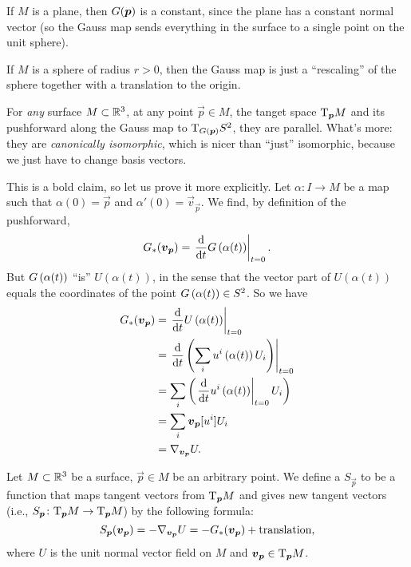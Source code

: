 \begin{example}
If $M$ is a plane, then $G(\boldsymbol{p})$ is a constant, since the plane
has a constant normal vector (so the Gauss map sends everything in the
surface to a single point on the unit sphere).
\end{example}

\begin{example}
If $M$ is a sphere of radius $r>0$, then the Gauss map is just a
``rescaling'' of the sphere together with a translation to the origin.
\end{example}

For \emph{any} surface $M\subset\mathbb{R}^{3}$, at any point $\vec{p}\in M$,
the tanget space $\mathrm{T}_{\boldsymbol{p}}M$ and its pushforward along the Gauss map
to $\mathrm{T}_{G(\boldsymbol{p})}S^{2}$, they are parallel. What's
more: they are \emph{canonically isomorphic}, which is nicer than
``just'' isomorphic, because we just have to change basis vectors.

This is a bold claim, so let us prove it more explicitly. Let
$\alpha\colon I\to M$ be a map such that $\alpha(0)=\vec{p}$ and
$\alpha'(0)=\vec{v}_{\vec{p}}$. We find, by definition of the pushforward,
\begin{equation}
G_{*}(\boldsymbol{v}_{\boldsymbol{p}}) = \left.\frac{\mathrm{d}}{\mathrm{d} t} G\left(\alpha(t)\right)\right|_{t=0}.
\end{equation}
But $G\left(\alpha(t)\right)$ ``is'' $U\left(\alpha(t)\right)$, in
the sense that the vector part of $U\left(\alpha(t)\right)$ equals the
coordinates of the point $G\left(\alpha(t)\right)\in S^{2}$. So we
have
\begin{subequations}
\begin{align}
G_{*}(\boldsymbol{v}_{\boldsymbol{p}}) &= \left.\frac{\mathrm{d}}{\mathrm{d} t}U\left(\alpha(t)\right)\right|_{t=0}\\
&= \left.\frac{\mathrm{d}}{\mathrm{d} t}\left(\sum_{i}u^{i}\left(\alpha(t)\right)U_{i}\right)\right|_{t=0}\\
&= \sum_{i}\left(\left.\frac{\mathrm{d}}{\mathrm{d} t}u^{i}\left(\alpha(t)
\right)\right|_{t=0}U_{i}\right)\\
&= \sum_{i}\boldsymbol{v}_{\boldsymbol{p}}[u^{i}]U_{i}\\
&= \nabla_{\boldsymbol{v}_{\boldsymbol{p}}}U.
\end{align}
\end{subequations}

\begin{definition}
Let $M\subset\mathbb{R}^{3}$ be a surface, $\vec{p}\in M$ be an arbitrary point.
We define a  $S_{\vec{p}}$ to be a function that
maps tangent vectors from $\mathrm{T}_{\boldsymbol{p}}M$ and gives new tangent vectors
(i.e., $S_{\boldsymbol{p}}\colon\mathrm{T}_{\boldsymbol{p}}M\to\mathrm{T}_{\boldsymbol{p}}M$)
by the following formula:
\begin{equation}
S_{\boldsymbol{p}}(\boldsymbol{v}_{\boldsymbol{p}}) = -\nabla_{\boldsymbol{v}_{\boldsymbol{p}}}U = -G_{*}(\boldsymbol{v}_{\boldsymbol{p}})+\mbox{translation},
\end{equation}
where $U$ is the unit normal vector field on $M$ and
$\boldsymbol{v}_{\boldsymbol{p}}\in\mathrm{T}_{\boldsymbol{p}}M$. 
\end{definition}

